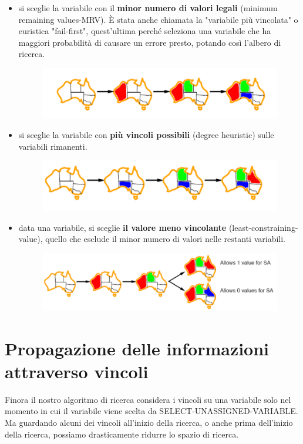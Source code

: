 \begin{itemize}
    \item si sceglie la variabile con il \textbf{minor numero di valori legali} (minimum remaining values-MRV). È stata anche chiamata la "variabile più vincolata" o euristica "fail-first", quest’ultima perché seleziona una variabile che ha maggiori probabilità di causare un errore presto, potando così l’albero di ricerca.
    \begin{figure}[htp]
    	\centering
        \includegraphics[width=12cm, keepaspectratio]{img/Cap2/m1.png}
    \end{figure}
    \item si sceglie la variabile con \textbf{più vincoli possibili} (degree heuristic) sulle variabili rimanenti.
    \begin{figure}[htp]
    	\centering
        \includegraphics[width=12cm, keepaspectratio]{img/Cap2/m2.png}
    \end{figure}
    \item data una variabile, si sceglie \textbf{il valore meno vincolante} (least-constraining-value), quello che esclude il minor numero di valori nelle restanti variabili.
    \begin{figure}[htp]
    	\centering
        \includegraphics[width=12cm, keepaspectratio]{img/Cap2/m3.png}
    \end{figure}
\end{itemize}

\section{Propagazione delle informazioni attraverso vincoli}
Finora il nostro algoritmo di ricerca considera i vincoli su una variabile solo nel momento in cui il variabile viene scelta da SELECT-UNASSIGNED-VARIABLE. Ma guardando alcuni dei vincoli all’inizio della ricerca, o anche prima dell’inizio della ricerca, possiamo drasticamente ridurre lo spazio di ricerca.
